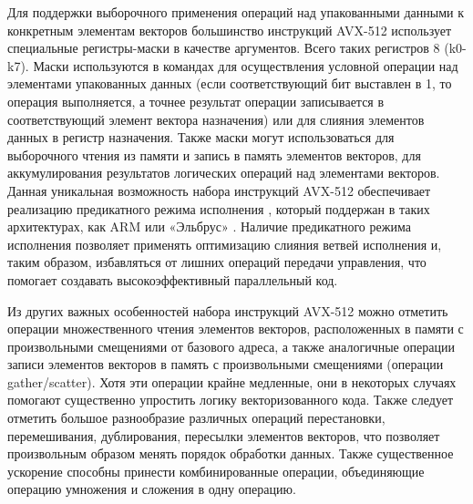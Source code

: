 Для поддержки выборочного применения операций над упакованными данными к конкретным элементам векторов большинство инструкций AVX-512 использует специальные регистры-маски в качестве аргументов.
Всего таких регистров 8 (k0-k7).
Маски используются в командах для осуществления условной операции над элементами упакованных данных (если соответствующий бит выставлен в 1, то операция выполняется, а точнее результат операции записывается в соответствующий элемент вектора назначения) или для слияния элементов данных в регистр назначения.
Также маски могут использоваться для выборочного чтения из памяти и запись в память элементов векторов, для аккумулирования результатов логических операций над элементами векторов.
Данная уникальная возможность набора инструкций AVX-512 обеспечивает реализацию предикатного режима исполнения\label{term:predicate_execution} \cite{Volkonsky2003VecPred}, который поддержан в таких архитектурах, как ARM\label{abbr:arm} или «Эльбрус» \cite{Kim2013VecElb}.
Наличие предикатного режима исполнения позволяет применять оптимизацию слияния ветвей исполнения и, таким образом, избавляться от лишних операций передачи управления, что помогает создавать высокоэффективный параллельный код.

Из других важных особенностей набора инструкций AVX-512 можно отметить операции множественного чтения элементов векторов, расположенных в памяти с произвольными смещениями от базового адреса, а также аналогичные операции записи элементов векторов в память с произвольными смещениями (операции gather/scatter).
Хотя эти операции крайне медленные, они в некоторых случаях помогают существенно упростить логику векторизованного кода.
Также следует отметить большое разнообразие различных операций перестановки, перемешивания, дублирования, пересылки элементов векторов, что позволяет произвольным образом менять порядок обработки данных.
Также существенное ускорение способны принести комбинированные операции, объединяющие операцию умножения и сложения в одну операцию.

